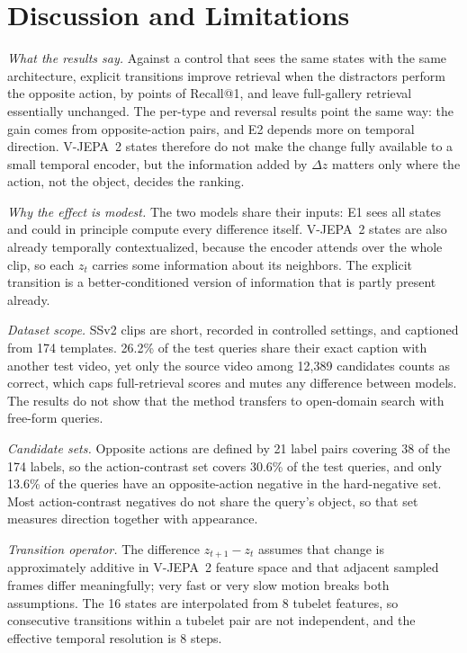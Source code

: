 \documentclass[lettersize,journal]{IEEEtran}
\begin{document}

\section{Discussion and Limitations}
\label{sec:discussion}
\emph{What the results say.} Against a control that sees the same states with
the same architecture, explicit transitions improve retrieval when the
distractors perform the opposite action, by \DeltaAcRone{} points of Recall@1,
and leave full-gallery retrieval essentially unchanged. The per-type and
reversal results point the same way: the gain comes from opposite-action pairs,
and E2 depends more on temporal direction. V-JEPA~2 states therefore do not make
the change fully available to a small temporal encoder, but the information
added by $\Delta z$ matters only where the action, not the object, decides the
ranking.

\emph{Why the effect is modest.} The two models share their inputs: E1 sees all
states and could in principle compute every difference itself. V-JEPA~2 states
are also already temporally contextualized, because the encoder attends over
the whole clip, so each $z_t$ carries some information about its neighbors. The
explicit transition is a better-conditioned version of information that is
partly present already.

\emph{Dataset scope.} SSv2 clips are short, recorded in controlled settings,
and captioned from 174 templates. 26.2\% of the test queries share their exact
caption with another test video, yet only the source video among 12{,}389
candidates counts as correct, which caps full-retrieval scores and mutes any
difference between models. The results do not show that the method transfers to
open-domain search with free-form queries.

\emph{Candidate sets.} Opposite actions are defined by 21 label pairs covering
38 of the 174 labels, so the action-contrast set covers 30.6\% of the test
queries, and only 13.6\% of the queries have an opposite-action negative in the
hard-negative set. Most action-contrast negatives do not share the query's
object, so that set measures direction together with appearance.

\emph{Transition operator.} The difference $z_{t+1}-z_t$ assumes that change is
approximately additive in V-JEPA~2 feature space and that adjacent sampled
frames differ meaningfully; very fast or very slow motion breaks both
assumptions. The 16 states are interpolated from 8 tubelet features, so
consecutive transitions within a tubelet pair are not independent, and the
effective temporal resolution is 8 steps.
\end{document}
